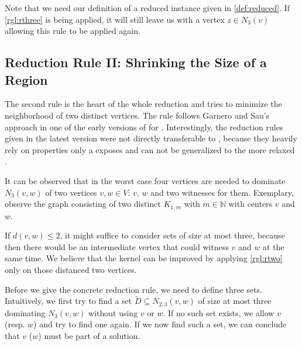 Note that we need our definition of a reduced instance given in \ref{def:reduced}. If \cref{rgl:rthree} is being applied, it will still leave us with a vertex $z\in N_3(v)$ allowing this rule to be applied again.

\subsection{Reduction Rule II: Shrinking the Size of a Region}

The second rule is the heart of the whole reduction and tries to minimize the neighborhood of two distinct vertices. The rule follows Garnero and Sau's approach in one of the early versions of \cite[Revision 2014]{Garnero2018} for \ptdom. Interestingly, the reduction rules given in the latest version were not directly transferable to \psdom, because they heavily rely on properties only a \ptdom exposes and can not be generalized to the more relaxed \psdom.





It can be observed that in the worst case four vertices are needed to dominate $N_3(v,w)$ of two vertices $v,w \in V$: $v$, $w$ and two witnesses for them. Exemplary, observe the graph consisting of two distinct $K_{1,m}$ with $m \in \mathbb{N}$ with centers $v$ and $w$.

If $d(v,w) \leq 2$, it might suffice to consider sets of size at most three, because then there would be an intermediate vertex that could witness $v$ and $w$ at the same time. We believe that the kernel can be improved by applying \cref{rgl:rtwo} only on those distanced two vertices. 

Before we give the concrete reduction rule, we need to define three sets. Intuitively, we first try to find a set $\tilde D \subseteq N_{2,3}(v,w)$ of size at most three dominating $N_3(v,w)$ without using $v$ or $w$. If no such set exists, we allow $v$ (resp. $w$) and try to find one again. If we now find such a set, we can conclude that $v$ ($w$) must be part of a solution.

